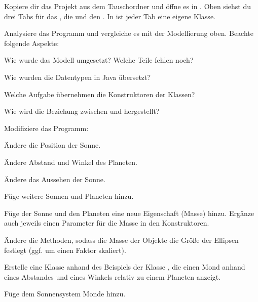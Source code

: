 \documentclass[10pt, a4paper]{arbeitsblatt}
\begin{document}
\newpage
\begin{aufgabe}
Kopiere dir das Projekt  aus dem Tauschordner und öffne es in . Oben siehst du drei Tabs für das , die  und den . In  ist jeder Tab eine eigene Klasse.

Analysiere das Programm und vergleiche es mit der Modellierung oben. Beachte folgende Aspekte:
\begin{multicols}{2}
\begin{smallitem}
	\item Wie wurde das Modell umgesetzt? Welche Teile fehlen noch?
	\item Wie wurden die Datentypen in Java übersetzt?
	\item Welche Aufgabe übernehmen die Konstruktoren der Klassen?
	\item Wie wird die Beziehung zwischen  und  hergestellt?
\end{smallitem}
\end{multicols}
\end{aufgabe}

\begin{aufgabe}
Modifiziere das Programm:
\begin{multicols}{2}
\begin{smallitem}
	\item Ändere die Position der Sonne.
	\item Ändere Abstand und Winkel des Planeten.
	\item Ändere das Aussehen der Sonne.
	\item Füge weitere Sonnen und Planeten hinzu.
	\item Füge der Sonne und den Planeten eine neue Eigenschaft  (Masse) hinzu. Ergänze auch jeweils einen Parameter für die Masse in den Konstruktoren.
	\item Ändere die  Methoden, sodass die Masse der Objekte die Größe der Ellipsen festlegt (ggf. um einen Faktor skaliert).
\end{smallitem}
\end{multicols}
\end{aufgabe}

\begin{aufgabe}
Erstelle eine Klasse  anhand des Beispiels der Klasse ,
die einen Mond anhand eines Abstandes und eines Winkels relativ zu einem Planeten anzeigt.


Füge dem Sonnensystem Monde hinzu.
\end{aufgabe}
\end{document}
